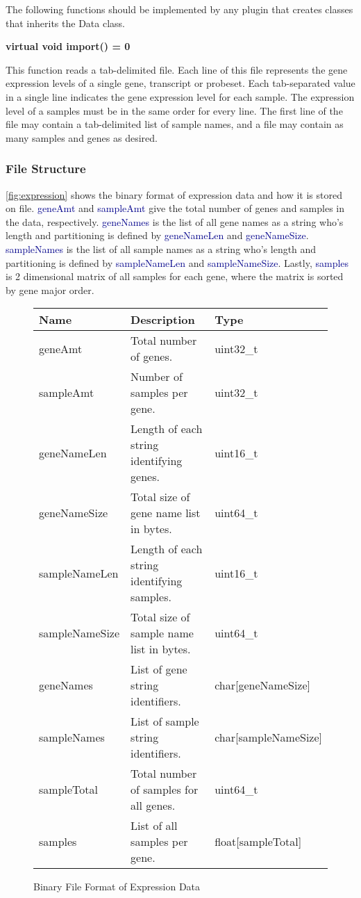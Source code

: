 \documentclass[10pt]{article}
\providecommand{\h}[1]{\textcolor{darkblue}{#1}}
\begin{document}
\begin{appendices}
The following functions should be implemented by any plugin that creates
classes that inherits the Data class.

{\bfseries virtual void import() = 0}

This function reads a tab-delimited file.  Each line of this file
represents the gene expression levels of a single gene, transcript or probeset.
Each tab-separated value in a single line indicates the gene expression level 
for each sample. The expression level of a samples must be in the same 
order for every line.  The first line of the file may contain a tab-delimited
list of sample names, and a file may contain as many samples and genes as
desired.

\subsubsection{File Structure}

\autoref{fig:expression} shows the binary format of expression data and how it 
is stored on file. \h{geneAmt} and \h{sampleAmt} give the total number of genes 
and samples in the data, respectively. \h{geneNames} is the list of all gene 
names as a string who's length and partitioning is defined by \h{geneNameLen} 
and \h{geneNameSize}. \h{sampleNames} is the list of all sample names as a 
string who's length and partitioning is defined by \h{sampleNameLen} and 
\h{sampleNameSize}. Lastly, \h{samples} is 2 dimensional matrix of all samples 
for each gene, where the matrix is sorted by gene major order.

\begin{figure}[H]
\begin{mdframed}[style=btable]
\begin{tabularx}{\textwidth}{|l|X|l|}
\hline
\textbf{Name} & \textbf{Description} & \textbf{Type} \\
\hline
geneAmt & Total number of genes. & uint32\_t \\
\hline
sampleAmt & Number of samples per gene. & uint32\_t \\
\hline
geneNameLen & Length of each string identifying genes. & uint16\_t \\
\hline
geneNameSize & Total size of gene name list in bytes. & uint64\_t \\
\hline
sampleNameLen & Length of each string identifying samples. & uint16\_t \\
\hline
sampleNameSize & Total size of sample name list in bytes. & uint64\_t \\
\hline
geneNames & List of gene string identifiers. & char[geneNameSize] \\
\hline
sampleNames & List of sample string identifiers. & char[sampleNameSize] \\
\hline
sampleTotal & Total number of samples for all genes. & uint64\_t \\
\hline
samples & List of all samples per gene. & float[sampleTotal] \\
\hline
\end{tabularx}
\end{mdframed}
\caption{Binary File Format of Expression Data}
\label{fig:expression}
\end{figure}


\end{appendices}
\end{document}
